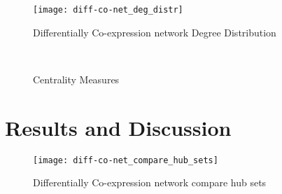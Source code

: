 \documentclass[
10pt, %
a4paper, %
oneside, %
headinclude,footinclude, %
BCOR5mm, %
]{scrartcl}
\begin{document}
\begin{figure}[h!]
\centering 
\texttt{[image: diff-co-net\_deg\_distr]} 
\caption[Differentially Co-expression network Degree Distribution]{Differentially Co-expression network Degree Distribution} %
\label{fig:5} 
\end{figure}

\begin{figure}[h!]
\centering
{} \quad
{} \\
 \quad
{}
\caption[Centrality Measures Differential Co-Net]{Centrality Measures} %
\label{fig:esempio}
\end{figure}

\newpage

\section{Results and Discussion}
\begin{figure}[h!]
\centering 
\texttt{[image: diff-co-net\_compare\_hub\_sets]} 
\caption[Differentially Co-expression network compare hub sets]{Differentially Co-expression network compare hub sets} %
\label{fig:5} 
\end{figure}



\newpage

\renewcommand{\refname}{\spacedlowsmallcaps{References}} %




\end{document}
